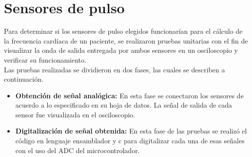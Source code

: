
\section{Sensores de pulso}
Para determinar si los sensores de pulso elegidos funcionarían para el cálculo de la frecuencia cardíaca de un paciente, se realizaron pruebas unitarias con el fin de  visualizar la onda de salida entregada por ambos sensores en un osciloscopio y verificar su funcionamiento.\\

Las pruebas realizadas se dividieron en dos fases, las cuales se describen a continuación.

\begin{itemize}
	\item \textbf{Obtención de señal analógica:} En esta fase se conectaron los sensores de acuerdo a lo especificado en su hoja de datos. La señal de salida de cada sensor fue visualizada en el osciloscopio.
	\item \textbf{Digitalización de señal obtenida:} En esta fase de las pruebas se realizó el código en lenguaje ensamblador y c para digitalizar cada una de esas señales con el uso del ADC del microcontrolador.
\end{itemize}


